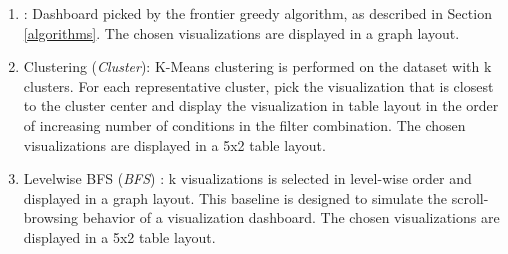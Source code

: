 \begin{enumerate}
	\item \system: Dashboard picked by the frontier greedy algorithm, as described in Section \ref{algorithms}. The chosen visualizations are displayed in a graph layout.
	\item Clustering (\textit{Cluster}): K-Means clustering is performed on the dataset with k clusters. For each representative cluster, pick the visualization that is closest to the cluster center and display the visualization in table layout in the order of increasing number of conditions in the filter combination. The chosen visualizations are displayed in a 5x2 table layout.
	\item Levelwise BFS (\textit{BFS}) : k visualizations is selected in level-wise order and displayed in a graph layout. This baseline is designed to simulate the scroll-browsing behavior of a visualization dashboard. The chosen visualizations are displayed in a 5x2 table layout.
\end{enumerate}
